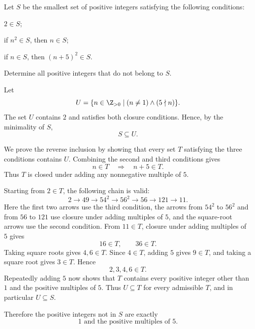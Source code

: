     \begin{expectedproblem}[2017 Putnam]
        Let $S$ be the smallest set of positive integers satisfying the
        following conditions:
        \begin{problemchoices}
            \item $2\in S$;
            \item if $n^2\in S$, then $n\in S$;
            \item if $n\in S$, then $(n+5)^2\in S$.
        \end{problemchoices}
        Determine all positive integers that do not belong to $S$.
    \end{expectedproblem}

    \begin{solution}
        Let
        \[
            U=\{n\in\Z_{>0}\mid (n\neq1)\land(5\nmid n)\}.
        \]
        The set $U$ contains $2$ and satisfies both closure conditions. Hence,
        by the minimality of $S$,
        \[
            S\subseteq U.
        \]

        We prove the reverse inclusion by showing that every set $T$ satisfying
        the three conditions contains $U$. Combining the second and third
        conditions gives
        \[
            n\in T
            \quad\Longrightarrow\quad
            n+5\in T.
        \]
        Thus $T$ is closed under adding any nonnegative multiple of $5$.

        Starting from $2\in T$, the following chain is valid:
        \[
            2
            \longrightarrow
            49
            \longrightarrow
            54^2
            \longrightarrow
            56^2
            \longrightarrow
            56
            \longrightarrow
            121
            \longrightarrow
            11.
        \]
        Here the first two arrows use the third condition, the arrows from
        $54^2$ to $56^2$ and from $56$ to $121$ use closure under adding
        multiples of $5$, and the square-root arrows use the second condition.
        From $11\in T$, closure under adding multiples of $5$ gives
        \[
            16\in T,
            \qquad
            36\in T.
        \]
        Taking square roots gives $4,6\in T$. Since $4\in T$, adding $5$
        gives $9\in T$, and taking a square root gives $3\in T$. Hence
        \[
            2,3,4,6\in T.
        \]
        Repeatedly adding $5$ now shows that $T$ contains every positive
        integer other than $1$ and the positive multiples of $5$. Thus
        $U\subseteq T$ for every admissible $T$, and in particular
        $U\subseteq S$.

        Therefore the positive integers not in $S$ are exactly
        \[
            \boxed{1\text{ and the positive multiples of }5}.
        \]
    \end{solution}

